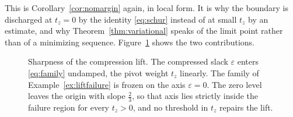 This is Corollary~\ref{cor:nomargin} again, in local form.  It is why the
boundary is discharged at $t_z=0$ by the identity \eqref{eq:schur}
instead of at small $t_z$ by an estimate, and why
Theorem~\ref{thm:variational} speaks of the limit point rather than of a
minimizing sequence.  Figure~\ref{fig:sharp} shows the two contributions.

\begin{figure}[ht]
  \centering
  
  \caption{Sharpness of the compression lift.  The compressed slack $\varepsilon$
  enters \eqref{eq:family} undamped, the pivot weight $t_z$ linearly.  The
  family of Example~\ref{ex:liftfailure} is frozen on the axis $\varepsilon=0$.  The
  zero level leaves the origin with slope $\tfrac23$, so that axis lies
  strictly inside the failure region for every $t_z>0$, and no threshold
  in $t_z$ repairs the lift.}
  \label{fig:sharp}
\end{figure}
